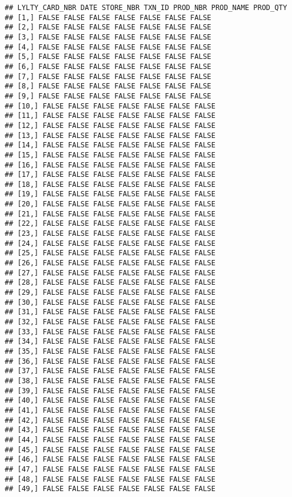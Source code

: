 \documentclass[
]{article}
\begin{document}
\begin{verbatim}
## LYLTY_CARD_NBR DATE STORE_NBR TXN_ID PROD_NBR PROD_NAME PROD_QTY
## [1,] FALSE FALSE FALSE FALSE FALSE FALSE FALSE
## [2,] FALSE FALSE FALSE FALSE FALSE FALSE FALSE
## [3,] FALSE FALSE FALSE FALSE FALSE FALSE FALSE
## [4,] FALSE FALSE FALSE FALSE FALSE FALSE FALSE
## [5,] FALSE FALSE FALSE FALSE FALSE FALSE FALSE
## [6,] FALSE FALSE FALSE FALSE FALSE FALSE FALSE
## [7,] FALSE FALSE FALSE FALSE FALSE FALSE FALSE
## [8,] FALSE FALSE FALSE FALSE FALSE FALSE FALSE
## [9,] FALSE FALSE FALSE FALSE FALSE FALSE FALSE
## [10,] FALSE FALSE FALSE FALSE FALSE FALSE FALSE
## [11,] FALSE FALSE FALSE FALSE FALSE FALSE FALSE
## [12,] FALSE FALSE FALSE FALSE FALSE FALSE FALSE
## [13,] FALSE FALSE FALSE FALSE FALSE FALSE FALSE
## [14,] FALSE FALSE FALSE FALSE FALSE FALSE FALSE
## [15,] FALSE FALSE FALSE FALSE FALSE FALSE FALSE
## [16,] FALSE FALSE FALSE FALSE FALSE FALSE FALSE
## [17,] FALSE FALSE FALSE FALSE FALSE FALSE FALSE
## [18,] FALSE FALSE FALSE FALSE FALSE FALSE FALSE
## [19,] FALSE FALSE FALSE FALSE FALSE FALSE FALSE
## [20,] FALSE FALSE FALSE FALSE FALSE FALSE FALSE
## [21,] FALSE FALSE FALSE FALSE FALSE FALSE FALSE
## [22,] FALSE FALSE FALSE FALSE FALSE FALSE FALSE
## [23,] FALSE FALSE FALSE FALSE FALSE FALSE FALSE
## [24,] FALSE FALSE FALSE FALSE FALSE FALSE FALSE
## [25,] FALSE FALSE FALSE FALSE FALSE FALSE FALSE
## [26,] FALSE FALSE FALSE FALSE FALSE FALSE FALSE
## [27,] FALSE FALSE FALSE FALSE FALSE FALSE FALSE
## [28,] FALSE FALSE FALSE FALSE FALSE FALSE FALSE
## [29,] FALSE FALSE FALSE FALSE FALSE FALSE FALSE
## [30,] FALSE FALSE FALSE FALSE FALSE FALSE FALSE
## [31,] FALSE FALSE FALSE FALSE FALSE FALSE FALSE
## [32,] FALSE FALSE FALSE FALSE FALSE FALSE FALSE
## [33,] FALSE FALSE FALSE FALSE FALSE FALSE FALSE
## [34,] FALSE FALSE FALSE FALSE FALSE FALSE FALSE
## [35,] FALSE FALSE FALSE FALSE FALSE FALSE FALSE
## [36,] FALSE FALSE FALSE FALSE FALSE FALSE FALSE
## [37,] FALSE FALSE FALSE FALSE FALSE FALSE FALSE
## [38,] FALSE FALSE FALSE FALSE FALSE FALSE FALSE
## [39,] FALSE FALSE FALSE FALSE FALSE FALSE FALSE
## [40,] FALSE FALSE FALSE FALSE FALSE FALSE FALSE
## [41,] FALSE FALSE FALSE FALSE FALSE FALSE FALSE
## [42,] FALSE FALSE FALSE FALSE FALSE FALSE FALSE
## [43,] FALSE FALSE FALSE FALSE FALSE FALSE FALSE
## [44,] FALSE FALSE FALSE FALSE FALSE FALSE FALSE
## [45,] FALSE FALSE FALSE FALSE FALSE FALSE FALSE
## [46,] FALSE FALSE FALSE FALSE FALSE FALSE FALSE
## [47,] FALSE FALSE FALSE FALSE FALSE FALSE FALSE
## [48,] FALSE FALSE FALSE FALSE FALSE FALSE FALSE
## [49,] FALSE FALSE FALSE FALSE FALSE FALSE FALSE

\end{verbatim}
\end{document}
